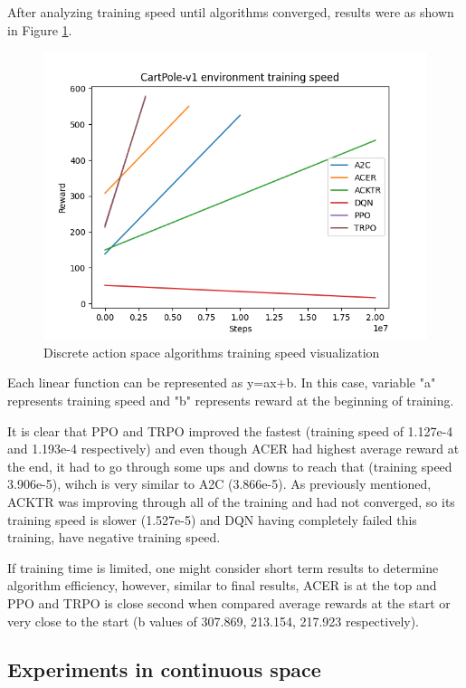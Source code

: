\documentclass[12pt, a4paper]{article}
\begin{document}
After analyzing training speed until algorithms converged, results were as shown in Figure \ref{DiscreteSpeedGraph}.
\begin{figure}[H]
    \centering
    \includegraphics[width=1\linewidth]{images/cartpole_results_speed.png}
    \caption{Discrete action space algorithms training speed visualization}
    \label{DiscreteSpeedGraph}
\end{figure}

Each linear function can be represented as y=ax+b. In this case, variable "a" represents training speed and "b" represents reward at the beginning of training. 

It is clear that PPO and TRPO improved the fastest (training speed of 1.127e-4 and 1.193e-4 respectively) and even though ACER had highest average reward at the end, it had to go through some ups and downs to reach that (training speed 3.906e-5), wihch is very similar to A2C (3.866e-5). As previously mentioned, ACKTR was improving through all of the training and had not converged, so its training speed is slower (1.527e-5) and DQN having completely failed this training, have negative training speed.

If training time is limited, one might consider short term results to determine algorithm efficiency, however, similar to final results, ACER is at the top and PPO and TRPO is close second when compared average rewards at the start or very close to the start (b values of 307.869, 213.154, 217.923 respectively).

\subsection{Experiments in continuous space}
\end{document}
